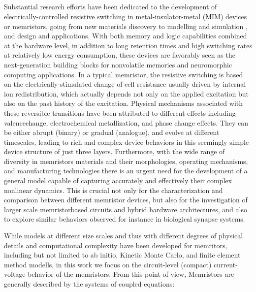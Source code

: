 \documentclass[10pt]{article}
\begin{document}
    \begin{multicols}{2}
    {\centering
    \section{}}
        \medskip
        Substantial research efforts have been dedicated to the development of electrically-controlled resistive switching in metal-insulator-metal (MIM) devices or memristors, going from new materials discovery\cite{cit1, cit2, cit3, cit4, cit5, cit6, cit7} to modelling and simulation\cite{cit8, cit9, cit10} , and design and applications\cite{cit3}. With both memory and logic capabilities combined at the hardware level, in addition to long retention times and high switching rates at relatively low energy consumption\cite{cit1}, these devices are favorably seen as the next-generation building blocks for nonvolatile memories and neuromorphic computing applications. In a typical memristor, the resistive switching is based on the electrically-stimulated change of cell resistance usually driven by internal ion redistribution, which actually depends not only on the applied excitation but also on the past history of the excitation\cite{cit6}. Physical mechanisms associated with these reversible transitions have been attributed to different effects including valencechange, electrochemical metallization, and phase change effects. They can be either abrupt (binary) or gradual (analogue), and evolve at different timescales, leading to rich and complex device behaviors in this seemingly simple device structure of just three layers. Furthermore, with the wide range of diversity in memristors materials and their morphologies, operating mechanisms, and manufacturing technologies there is an urgent need for the development of a general model capable of capturing accurately and effectively their complex nonlinear dynamics. This is crucial not only for the characterization and comparison between different memristor devices, but also for the investigation of larger scale memristorbased circuits and hybrid hardware architectures, and also to explore similar behaviors observed for instance in biological synapse systems.
        \medskip
        \par
        While models at different size scales and thus with different degrees of physical details and computational complexity have been developed for memritors, including but not limited to ab initio, Kinetic Monte Carlo, and finite element method modells, in this work we focus on the circuit-level (compact) current-voltage behavior of the memristors. From this point of view, Memristors are generally described by the systems of coupled equations:

\end{multicols}
\end{document}
